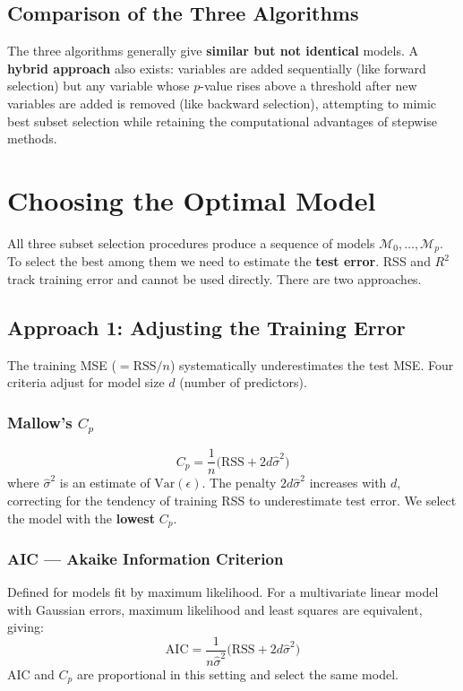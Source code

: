\documentclass[11pt,a4paper]{article}
\theoremstyle{definition}
\theoremstyle{plain}
\theoremstyle{remark}
\begin{document}
\subsection{Comparison of the Three Algorithms}

The three algorithms generally give \textbf{similar but not identical} models. A \textbf{hybrid approach} also exists: variables are added sequentially (like forward selection) but any variable whose $p$-value rises above a threshold after new variables are added is removed (like backward selection), attempting to mimic best subset selection while retaining the computational advantages of stepwise methods.


\section{Choosing the Optimal Model}

All three subset selection procedures produce a sequence of models $\mathcal{M}_0, \ldots, \mathcal{M}_p$. To select the best among them we need to estimate the \textbf{test error}. RSS and $R^2$ track training error and cannot be used directly. There are two approaches.

\subsection{Approach 1: Adjusting the Training Error}

The training MSE ($= \mathrm{RSS}/n$) systematically underestimates the test MSE. Four criteria adjust for model size $d$ (number of predictors).

\subsubsection{Mallow's \texorpdfstring{$C_p$}{Cp}}

\[
    C_p = \frac{1}{n}\bigl(\mathrm{RSS} + 2d\hat{\sigma}^2\bigr)
\]
where $\hat{\sigma}^2$ is an estimate of $\mathrm{Var}(\epsilon)$. The penalty $2d\hat{\sigma}^2$ increases with $d$, correcting for the tendency of training RSS to underestimate test error. We select the model with the \textbf{lowest} $C_p$.

\subsubsection{AIC — Akaike Information Criterion}

Defined for models fit by maximum likelihood. For a multivariate linear model with Gaussian errors, maximum likelihood and least squares are equivalent, giving:
\[
    \mathrm{AIC} = \frac{1}{n\hat{\sigma}^2}\bigl(\mathrm{RSS} + 2d\hat{\sigma}^2\bigr)
\]
AIC and $C_p$ are proportional in this setting and select the same model.
\end{document}
